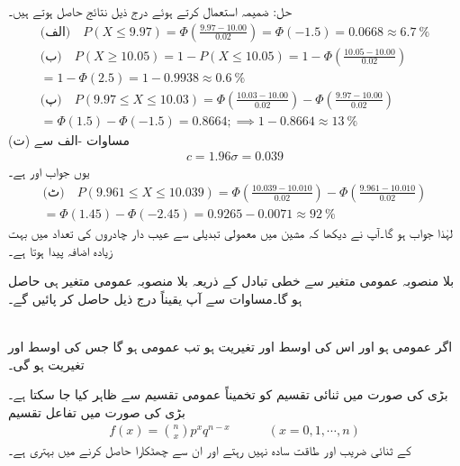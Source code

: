 حل:\quad
 ضمیمہ  استعمال کرتے ہوئے درج ذیل نتائج حاصل ہوتے ہیں۔
\begin{align*}
\text{(الف)}\quad P(X\le 9.97)=\Phi(\frac{9.97-10.00}{0.02})=\Phi(-1.5)=0.0668\approx \SI{6.7}{\percent}\\
\text{(ب)} \quad P(X\ge 10.05)=1-P(X\le 10.05)=1-\Phi(\frac{10.05-10.00}{0.02})\\
=1-\Phi(2.5)=1-0.9938\approx \SI{0.6}{\percent}\\
\text{(پ)}  \quad P(9.97\le X\le 10.03)=\Phi(\frac{10.03-10.00}{0.02})-\Phi(\frac{9.97-10.00}{0.02})\\
=\Phi(1.5)-\Phi(-1.5)=0.8664; \implies 1-0.8664\approx \SI{13}{\percent}
\end{align*}
(ت) مساوات -الف سے
\begin{align*}
c=1.96\sigma=0.039
\end{align*}
یوں جواب  اور  ہے۔\\
\begin{align*}
\text{(ٹ)} \quad P(9.961\le X\le 10.039)=\Phi(\frac{10.039-10.010}{0.02})-\Phi(\frac{9.961-10.010}{0.02})\\
=\Phi(1.45)-\Phi(-2.45)=0.9265-0.0071\approx \SI{92}{\percent}
\end{align*}
لہٰذا جواب  ہو گا۔آپ نے دیکھا کہ مشین میں معمولی تبدیلی سے عیب دار چادروں کی تعداد میں بہت زیادہ اضافہ پیدا ہوتا ہے۔


بلا منصوبہ عمومی متغیر سے خطی تبادل کے ذریعہ بلا منصوبہ عمومی متغیر  ہی حاصل ہو گا۔مساوات  سے آپ یقیناً درج ذیل حاصل کر پائیں گے۔

\quad {}\\
اگر  عمومی ہو اور اس کی اوسط  اور تغیریت  ہو تب  عمومی ہو گا جس کی اوسط  اور تغیریت  ہو گی۔

بڑی  کی صورت میں ثنائی تقسیم کو تخمیناً عمومی تقسیم سے ظاہر کیا جا سکتا ہے۔بڑی  کی صورت میں تفاعل تقسیم
\begin{align}\label{مساوات_شماریات_ثنائی_مشکل}
f(x)=\binom{n}{x}p^xq^{n-x}\quad\quad\quad (x=0,1,\cdots,n)
\end{align} 
کے ثنائی  ضریب  اور طاقت سادہ نہیں رہتے اور ان سے چھٹکارا  حاصل کرنے میں بہتری ہے۔

